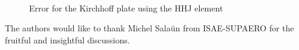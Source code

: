 \documentclass{ifacconf}
\begin{document}
\begin{figure}[ht]%
	\centering
	\hspace{8pt}%
	 \\
	\caption[errorHHF]{Error for the Kirchhoff plate using the HHJ element}%
	\label{fig:errorHHJ}%
\end{figure}


\begin{ack}
The authors would like to thank Michel Sala\"un from ISAE-SUPAERO for the fruitful and insightful discussions.
\end{ack}

                                                   


\end{document}
